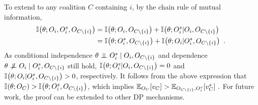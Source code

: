 \documentclass{article}
\theoremstyle{plain}
\theoremstyle{definition}
\theoremstyle{remark}
\begin{document}
To extend to any coalition $C$ containing $i$, 
by the chain rule of mutual information, 
\begin{align*}
\mathbb{I}\hspace{-0.5mm}\left(\theta; O_i, O^s_i, O_{C \setminus \{i\}}\right) &=
\mathbb{I}\hspace{-0.5mm}\left(\theta; O_i, O_{C \setminus \{i\}}\right) + \mathbb{I}\hspace{-0.5mm}\left(\theta; O^s_i | O_i, O_{C \setminus \{i\}}\right) \\ &=
\mathbb{I}\hspace{-0.5mm}\left(\theta; O_i^s, O_{C \setminus \{i\}}\right) + \mathbb{I}\hspace{-0.5mm}\left(\theta; O_i | O_i^s, O_{C \setminus \{i\}}\right)\ .
\end{align*}
As conditional independence $\theta \mathrel{\perp\mspace{-10mu}\perp} O^s_i \mid O_i, O_{C \setminus \{i\}}$ and dependence $\theta \nCI O_i \mid O^s_i, O_{C \setminus \{i\}}$ still hold, $\mathbb{I}\hspace{-0.5mm}\left(\theta; O^s_i | O_i, O_{C \setminus \{i\}}\right) = 0$ and  $\mathbb{I}\hspace{-0.5mm}\left(\theta; O_i | O_i^s, O_{C \setminus \{i\}}\right) > 0$, respectively.
It follows from the above expression that
$\mathbb{I}\hspace{-0.5mm}\left(\theta; O_C\right) > \mathbb{I}\hspace{-0.5mm}\left(\theta; O_i^s, O_{C \setminus \{i\}}\right)$, which implies $\mathbb{E}_{O_C} [v_C] > \mathbb{E}_{O_{C \setminus \{i\}}, O_i^s} [v_C^s]\ .$
For future work, the proof can be extended to other DP mechanisms.
\end{document}
